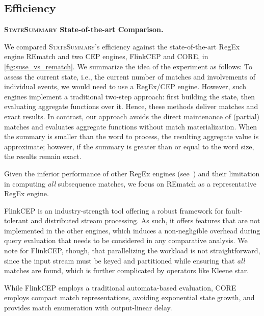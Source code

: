 \subsection{Efficiency}
\label{subsec:efficiency}
\textbf{\textsc{StateSummary} State-of-the-art Comparison.} {We compared \textsc{StateSummary}'s efficiency
against the state-of-the-art RegEx engine REmatch and two CEP engines,
FlinkCEP and CORE, in \autoref{fig:suse_vs_rematch}. {We summarize the idea
of the experiment as follows: To assess the current state, i.e., the current
number of matches and involvements of individual events, we would need to
use a RegEx/CEP engine. However, such engines implement a traditional
two-step approach: first building the state, then evaluating aggregate
functions over it.} Hence, these methods deliver matches and
exact results. In contrast, our approach avoids the direct maintenance
of (partial) matches and evaluates aggregate functions without match
materialization. When the summary is smaller than the word to process, the
resulting aggregate value is approximate; however, if the summary is greater
than or equal to the word size, the results remain exact.

Given the inferior performance of other RegEx engines
(see~\cite{Riveros2023}) {and their limitation in computing \emph{all}
subsequence matches}, we focus on REmatch as a representative RegEx engine.

FlinkCEP is an industry-strength tool offering a
robust framework for fault-tolerant and distributed stream processing. As
such, it offers features that are not implemented in the other engines,
which induces a non-negligible overhead during query evaluation that needs
to be considered in any comparative analysis. We note for FlinkCEP, though,
that parallelizing the workload is not straightforward, since the input
stream must be keyed and partitioned while ensuring that \emph{all} matches
are found, which is further complicated by operators like Kleene star.}
While FlinkCEP employs a traditional automata-based evaluation, CORE employs
compact match representations, avoiding exponential state growth, and
provides match enumeration with output-linear delay.


